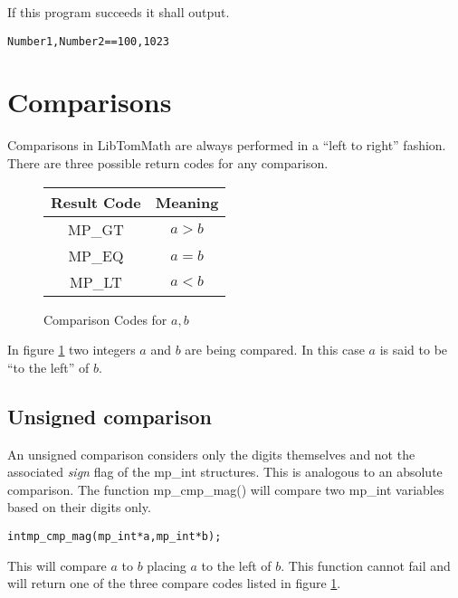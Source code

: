 \documentclass[synpaper]{book}
\begin{document}
If this program succeeds it shall output.
\begin{alltt}
Number1, Number2 == 100, 1023
\end{alltt}

\section{Comparisons}

Comparisons in LibTomMath are always performed in a ``left to right'' fashion.  There are three possible return codes
for any comparison.

  
\begin{figure}[h]
\begin{center}
\begin{tabular}{|c|c|}
\hline \textbf{Result Code} & \textbf{Meaning} \\
\hline MP\_GT & $a > b$ \\
\hline MP\_EQ & $a = b$ \\
\hline MP\_LT & $a < b$ \\
\hline
\end{tabular}
\end{center}
\caption{Comparison Codes for $a, b$}
\label{fig:CMP}
\end{figure}

In figure \ref{fig:CMP} two integers $a$ and $b$ are being compared.  In this case $a$ is said to be ``to the left'' of
$b$.

\subsection{Unsigned comparison}

An unsigned comparison considers only the digits themselves and not the associated \textit{sign} flag of the
mp\_int structures.  This is analogous to an absolute comparison.  The function mp\_cmp\_mag() will compare two
mp\_int variables based on their digits only.

\begin{alltt}
int mp_cmp_mag(mp_int * a, mp_int * b);
\end{alltt}
This will compare $a$ to $b$ placing $a$ to the left of $b$.  This function cannot fail and will return one of the
three compare codes listed in figure \ref{fig:CMP}.
\end{document}
